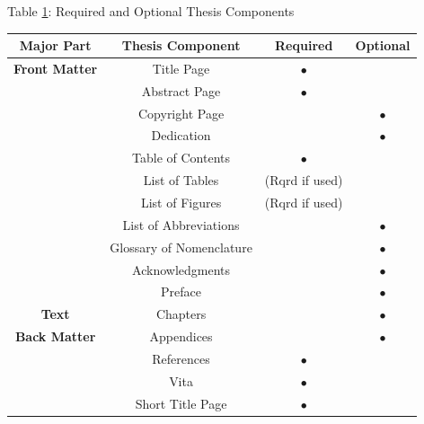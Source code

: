 \begin{table}[ht]
\label{tab:components}
\centering
Table \ref{tab:components}: Required and Optional Thesis Components


\vspace{0.125in}
\begin{spacing}{1}
\begin{tabular}{| c | c | c | c|}
\hline 
\textbf{Major Part} & \textbf{Thesis Component} & \textbf{Required}
 & \textbf{Optional} \\ \hline

\textbf{Front Matter} & Title Page & $\bullet$ & \\ \cline{2-4}
 & Abstract Page & $\bullet$ & \\ \cline{2-4}
 & Copyright Page & & $\bullet$ \\ \cline{2-4}
 & Dedication & & $\bullet$ \\ \cline{2-4}
 & Table of Contents & $\bullet$ & \\ \cline{2-4}
 & List of Tables & (Rqrd if used) & \\ \cline{2-4}
 & List of Figures & (Rqrd if used) & \\ \cline{2-4}
 & List of Abbreviations & & $\bullet$ \\ \cline{2-4}
 & Glossary of Nomenclature & & $\bullet$ \\ \cline{2-4}
 & Acknowledgments & & $\bullet$ \\ \cline{2-4}
 & Preface & & $\bullet$ \\ \hline

\textbf{Text} & Chapters & & $\bullet$ \\ \hline

\textbf{Back Matter} & Appendices & & $\bullet$ \\ \cline{2-4}
 & References & $\bullet$ & \\ \cline{2-4}
 & Vita & $\bullet$ & \\ \cline{2-4}
 & Short Title Page & $\bullet$ & \\ \hline
\end{tabular}
\end{spacing}
\end{table}

